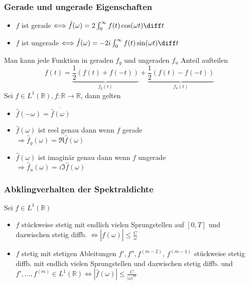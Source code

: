 \begin{sectionbox}
    \subsubsection{Gerade und ungerade Eigenschaften}
    \begin{itemize}
        \item $f$ ist gerade $\Longleftrightarrow \hat f(\omega)=2\int_0^\infty f(t)\cos(\omega t) \diff t$
        \item $f$ ist ungerade $\Longleftrightarrow \hat f(\omega) = -2i\int_0^\infty f(t)\sin(\omega t)\diff t$
    \end{itemize}
    Man kann jede Funktion in geraden $f_g$ und ungeraden $f_u$ Anteil aufteilen
    \begin{equation*}
        f(t)=\underbrace{\frac{1}{2}(f(t)+f(-t))}_{f_g(t)} + \underbrace{\frac{1}{2}(f(t)-f(-t))}_{f_u(t)}
    \end{equation*}
    Sei $f\in L^1(\mathbb R), f:\mathbb R \rightarrow \mathbb R$, dann gelten
    \begin{itemize}
        \item $\hat f(-\omega) = \overline{\hat f(\omega)}$
        \item $\hat f(\omega)$ ist reel genau dann wenn $f$ gerade \\ $\Rightarrow \hat f_g(\omega) = \Re{\hat f(\omega)}$
        \item $\hat f(\omega)$ ist imaginär genau dann wenn $f$ ungerade \\ $\Rightarrow \hat f_u(\omega) = i\Im{\hat f(\omega)}$
    \end{itemize}
\end{sectionbox}

\begin{sectionbox}
    \subsubsection{Abklingverhalten der Spektraldichte}
    Sei $f\in L^1(\mathbb R)$
    \begin{itemize}
        \item $f$ stückweise stetig mit endlich vielen Sprungstellen auf $[0,T]$ und dazwischen stetig diffb. $\Leftrightarrow |\hat f(\omega)| \le \frac{C}{\omega}$
        \item $f$ stetig mit stetigen Ableitungen $f', f'', f^{(m-2)}$, $f^{(m-1)}$ stückweise stetig diffb. mit endlich vielen Sprungstellen und dazwischen stetig diffb. und $f', ..., f^{(m)} \in L^1(\mathbb R) \Leftrightarrow |\hat f(\omega)| \le \frac{C}{|\omega|^m}$
    \end{itemize}
\end{sectionbox}

